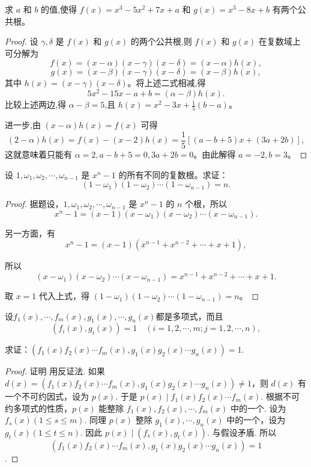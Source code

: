 \documentclass[lang=cn,12pt]{elegantbook}
\begin{document}
\begin{example}
求 \( a \) 和 \( b \) 的值,使得 \( f(x) = x^3 - 5x^2 + 7x + a \) 和 \( g(x) = x^3 - 8x + b \) 有两个公共根。
\end{example}

\begin{proof}
设 \(\gamma, \delta\) 是 \( f(x) \) 和 \( g(x) \) 的两个公共根,则 \( f(x) \) 和 \( g(x) \) 在复数域上可分解为
\[f(x) = (x - \alpha)(x - \gamma)(x - \delta) = (x - \alpha)h(x),\]
\[g(x) = (x - \beta)(x - \gamma)(x - \delta) = (x - \beta)h(x),\]
其中 \( h(x) = (x - \gamma)(x - \delta) \)。将上述二式相减,得
\[5x^2 - 15x - a + b = (\alpha - \beta)h(x).\]
比较上述两边,得 \(\alpha - \beta = 5\),且 \( h(x) = x^2 - 3x + \frac{1}{5}(b - a) \)。

进一步,由 \((x - \alpha)h(x) = f(x)\) 可得
\[(2 - \alpha)h(x) = f(x) - (x - 2)h(x) = \frac{1}{5}[(a - b + 5)x + (3a + 2b)],\]
这就意味着只能有 \(\alpha = 2, a - b + 5 = 0, 3a + 2b = 0\)。由此解得 \( a = -2, b = 3 \)。
\end{proof}

\begin{example}
设 \(1, \omega_1, \omega_2, \cdots, \omega_{n-1}\) 是 \(x^n - 1\) 的所有不同的复数根。求证：  
\[(1 - \omega_1)(1 - \omega_2) \cdots (1 - \omega_{n-1}) = n.\]
\end{example}

\begin{proof}
据题设，\(1, \omega_1, \omega_2, \cdots, \omega_{n-1}\) 是 \(x^n - 1\) 的 \(n\) 个根，所以  
\[x^n - 1 = (x - 1)(x - \omega_1)(x - \omega_2) \cdots (x - \omega_{n-1}).\]

另一方面，有  
\[x^n - 1 = (x - 1)(x^{n-1} + x^{n-2} + \cdots + x + 1),\]

所以  
\[(x - \omega_1)(x - \omega_2) \cdots (x - \omega_{n-1}) = x^{n-1} + x^{n-2} + \cdots + x + 1.\]

取 \(x = 1\) 代入上式，得 \((1 - \omega_1)(1 - \omega_2) \cdots (1 - \omega_{n-1}) = n\)。
\end{proof}

\begin{example}
    设$f_1(x),\cdots,f_m(x),g_1(x),\cdots,g_n(x)$都是多项式，而且
    \[
    (f_i(x),g_i(x))= 1 \quad (i = 1,2,\cdots,m;j=1,2,\cdots,n),
    \]\par
    求证：$(f_1(x)f_2(x)\cdots f_m(x),g_1(x)g_2(x)\cdots g_n(x)) = 1$.
\end{example}

\begin{proof}
    证明 用反证法. 如果 \( d(x) = (f_1(x) f_2(x) \cdots f_m(x), g_1(x) g_2(x) \cdots g_n(x)) \neq 1 \)，则 \( d(x) \) 有一个不可约因式，设为 \( p(x) \). 于是 \( p(x) \mid f_1(x) f_2(x) \cdots f_m(x) \). 根据不可约多项式的性质，\( p(x) \) 能整除 \( f_1(x), f_2(x), \cdots, f_m(x) \) 中的一个. 设为 \( f_s(x) (1 \leq s \leq m) \). 同理 \( p(x) \) 整除 \( g_1(x), \cdots, g_n(x) \) 中的一个，设为 \( g_t(x) (1 \leq t \leq n) \). 因此 \( p(x) \mid (f_s(x), g_t(x)) \). 与假设矛盾. 所以 \[ (f_1(x) f_2(x) \cdots f_m(x), g_1(x) g_2(x) \cdots g_n(x)) = 1 \].
\end{proof}
\end{document}
